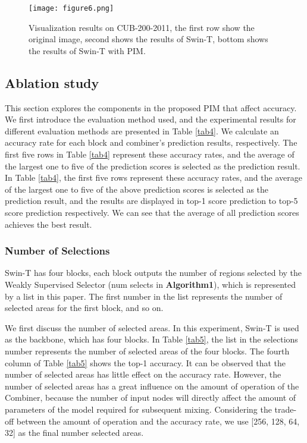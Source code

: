 \documentclass[conference]{IEEEtran}
\begin{document}
\begin{figure*}
\centerline{\texttt{[image: figure6.png]}}
\caption{Visualization results on CUB-200-2011, the first row show the original image, second shows the results of Swin-T, bottom shows the results of Swin-T with PIM.}
\label{fig6}
\end{figure*}

\subsection{Ablation study}

This section explores the components in the proposed PIM that affect accuracy. We first introduce the evaluation method used, and the experimental results for different evaluation methods are presented in Table \ref{tab4}. We calculate an accuracy rate for each block and combiner's prediction results, respectively. The first five rows in Table \ref{tab4} represent these accuracy rates, and the average of the largest one to five of the prediction scores is selected as the prediction result. In Table \ref{tab4}, the first five rows represent these accuracy rates, and the average of the largest one to five of the above prediction scores is selected as the prediction result, and the results are displayed in top-1 score prediction to top-5 score prediction respectively. We can see that the average of all prediction scores achieves the best result.

\subsubsection{Number of Selections}

Swin-T has four blocks, each block outputs the number of regions selected by the Weakly Supervised Selector (num selects in \textbf{Algorithm1}), which is represented by a list in this paper. The first number in the list represents the number of selected areas for the first block, and so on.

We first discuss the number of selected areas. In this experiment, Swin-T is used as the backbone, which has four blocks. In Table \ref{tab5}, the list in the selections number represents the number of selected areas of the four blocks. The fourth column of Table \ref{tab5} shows the top-1 accuracy. It can be observed that the number of selected areas has little effect on the accuracy rate. However, the number of  selected areas has a great influence on the amount of operation of the Combiner, because the number of input nodes will directly affect the amount of parameters of the model required for subsequent mixing. Considering the trade-off between the amount of operation and the accuracy rate, we use [256, 128, 64, 32] as the final number selected areas.
\end{document}
